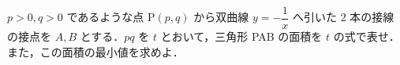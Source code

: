 \documentclass[../../main.tex]{subfiles}
\begin{document}
$p>0, q>0$ であるような点 P$(p,q)$ から双曲線 $\displaystyle y = -\dfrac{1}{x}$ へ引いた $2$ 本の接線の接点を $A, B$ とする．$pq$ を $t$ とおいて，三角形 PAB の面積を $t$ の式で表せ．
また，この面積の最小値を求めよ．
\end{document}
